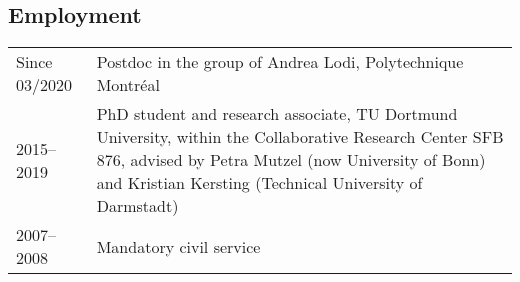 \documentclass[11pt, a4paper]{scrartcl}
\begin{document}
\subsection*{Employment}
\begin{tabular}{p{2.1cm}p{12.0cm}}
	Since 03/2020& Postdoc in the group of Andrea Lodi, Polytechnique Montréal\\
	2015--2019&PhD student and research associate, TU Dortmund University, within the Collaborative Research Center SFB 876, advised by Petra Mutzel (now University of Bonn) and Kristian Kersting (Technical University of Darmstadt)\\
	2007--2008&Mandatory civil service\\
\end{tabular}

\renewcommand{\refname}{\large\bfseries Publications}
\end{document}
